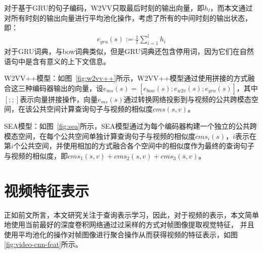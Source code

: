 对于基于GRU的句子编码，W2VV只取最后时刻的输出向量，即$h_l$，而本文通过对所有时刻的输出向量进行平均池化操作，考虑了所有的中间时刻的输出状态，即：
\begin{equation}
    \label{eq:gru-mean}
    \begin{aligned}
        e_{gru}(s) := \frac{1}{l}\sum^l_{i=1}h_i
    \end{aligned}
\end{equation}
对于GRU词典，与bow词典类似，但是GRU词典还包含停用词，因为它们在自然语句中是含有意义的上下文信息。

W2VV++模型：如图~\ref{fig:w2vv++}所示，W2VV++模型通过使用拼接的方式融合这三种编码器输出的向量，设$e_{ms}(s)=[e_{bow}(s);e_{w2v}(s);e_{gru}(s)]$，其中$[;;]$表示向量拼接操作，向量$e_{ms}(s)$通过转换网络投影到与视频的公共跨模态空间，在该公共空间计算查询句子与视频的相似度$cms(s,v)$。

SEA模型：如图~\ref{fig:sea}所示，SEA模型通过为每个编码器构建一个独立的公共跨模态空间，在每个公共空间单独计算查询句子与视频的相似度$cms_i(s)$，$i$表示在第$i$个公共空间，并使用相加的方式融合各个空间中的相似度作为最终的查询句子与视频的相似度，即$cms_1(s,v)+cms_2(s,v)+cms_3(s,v)$。

%

\section{视频特征表示}
正如前文所言，本文研究关注于查询表示学习，因此，对于视频的表示，本文简单地使用当前最好的深度卷积网络通过过采样的方式对帧图像提取视觉特征，
并且使用平均池化的操作对帧图像进行聚合操作从而获得视频的特征表示，如图\ref{fig:video-cnn-feat}所示。


